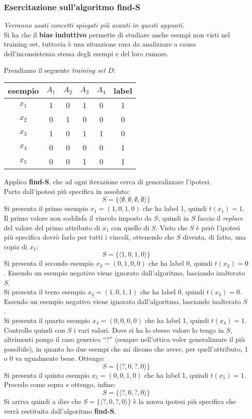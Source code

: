 \subsubsection{Esercitazione sull'algoritmo find-S}
\textit{Verranno usati concetti spiegati più avanti in questi appunti.}\\
Si ha che il \textbf{bias induttivo} permette di studiare anche esempi non
visti nel training set, tuttavia è una situazione rara da analizzare a causa
dell'inconsistenza stessa degli esempi e del loro rumore.
\begin{esempio}
  Prendiamo il seguente \textit{training set} $D$:
  \begin{table}[H]
    \centering
    \begin{tabular}[H]{c|cccc|c}
      esempio & $A_1$  & $A_2$  & $A_3$  & $A_4$ & label\\
      \hline
      $x_1$ & 1 & 0 & 1 & 0 & 1\\
      $x_2$ & 0 & 1 & 0 & 0 & 0\\
      $x_3$ & 1 & 0 & 1 & 1 & 0\\
      $x_4$ & 0 & 0 & 0 & 0 & 1\\
      $x_5$ & 0 & 0 & 1 & 0 & 1\\
    \end{tabular}
  \end{table}
  Applico \textbf{find-S}, che ad ogni iterazione cerca di generalizzare l'ipotesi.\\
  Parto dall'ipotesi più specifica in assoluto:
  \[S=\{\langle\emptyset,\emptyset,\emptyset,\emptyset\rangle\}\]
  Si presenta il primo esempio $x_1=(1,0,1,0)$ che ha label 1, quindi
  $t(x_1)=1$. Il primo valore non soddisfa il vincolo imposto da
  $S$, quindi in $S$ faccio il \textit{replace} del valore del primo attributo
  di $x_1$ con quello di $S$. Visto che $S$ è però l'ipotesi più specifica dovrò
  farlo per tutti i vincoli, ottenendo che $S$ diventa, di fatto, una copia di
  $x_1$: 
  \[S=\{\langle 1,0,1,0\rangle\}\]
  Si presenta il secondo esempio $x_2=(0,1,0,0)$ che ha label 0, quindi
  $t(x_2)=0$. Essendo un esempio negativo viene ignorato dall'algoritmo,
  lasciando inalterato $S$.\\
  Si presenta il terzo esempio $x_3=(1,0,1,1)$ che ha label 0, quindi
  $t(x_3)=0$. Essendo un esempio negativo viene ignorato dall'algoritmo,
  lasciando inalterato $S$.\\
  Si presenta il quarto esempio $x_4=(0,0,0,0)$ che ha label 1, quindi
  $t(x_4)=1$. Controllo quindi con $S$ i vari valori. Dove si ha lo stesso
  valore lo tengo in $S$, altrimenti pongo il caso generico ``?'' (sempre
  nell'ottica voler generalizzare il più possibile), in quanto ho
  due esempi che mi dicono che avere, per quell'attributo, 1 o 0 va ugualmente
  bene. Ottengo:
  \[S=\{\langle ?,0,?,0\rangle\}\]
  Si presenta il quinto esempio $x_5=(0,0,1,0)$ che ha label 1, quindi
  $t(x_5)=1$. Procedo come sopra e ottengo, infine:
  \[S=\{\langle ?,0,?,0\rangle\}\]
  Si arriva quindi a dire che $S=\{\langle ?,0,?,0\rangle\}$ è la nuova ipotesi
  più specifica che verrà restituita dall'algoritmo \textbf{find-S}.
\end{esempio}
